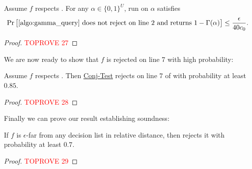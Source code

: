 \documentclass[11pt]{article}
\theoremstyle{definition}
\begin{document}
\begin{lemma}\label{thm: no query mistake when far}
    Assume $f$ respects . For any $\alpha\in \{0,1\}^U$, 
     run on $\alpha$ satisfies
$$
    \Pr\big[\text{\Cref{algo:gamma_query} does not reject on line {2}
and  returns $1-\Gamma(\alpha)$}\big]
    \le \frac{\epsilon}{40c_0}.$$
\end{lemma}
\begin{proof}\textcolor{red}{TOPROVE 27}\end{proof}

We are now ready to show that $f$
  is rejected on line 7 with high probability:
\begin{lemma}\label{thm: gamma is rejected whp}
    Assume $f$ respects . Then  \hyperlink{Algorithm2}{\sc Conj-Test}
    rejects on line $7$ of  with probability at least $0.85$.
\end{lemma}
\begin{proof}\textcolor{red}{TOPROVE 28}\end{proof}




















Finally we can prove our result establishing soundness:

\begin{theorem} \label{thm:soundness}
    If $f$ is $\epsilon$-far from any decision list in relative distance, then  rejects it with probability at least $0.7$. 
\end{theorem}
\begin{proof}\textcolor{red}{TOPROVE 29}\end{proof}
\end{document}
